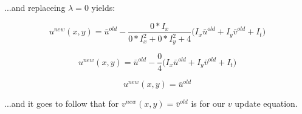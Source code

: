 \documentclass{article}
\begin{document}
\noindent ...and replaceing $\lambda=0$ yields:

\begin{equation}
    u^{new}(x,y) = \bar{u}^{old} -
    \frac{0 * I_x}{0 * I_x^2 + 0 * I_y^2 + 4}
    \bigg(
        I_x \bar{u}^{old} + I_y \bar{v}^{old} + I_t
    \bigg)
\end{equation}

\begin{equation}
    u^{new}(x,y) = \bar{u}^{old} -
    \frac{0}{4}
    \bigg(
        I_x \bar{u}^{old} + I_y \bar{v}^{old} + I_t
    \bigg)
\end{equation}

\begin{equation}
    u^{new}(x,y) = \bar{u}^{old}
\end{equation}

\noindent ...and it goes to follow that for $v^{new}(x,y)= \bar{v}^{old}$ is for our $v$ update equation.
\end{document}
